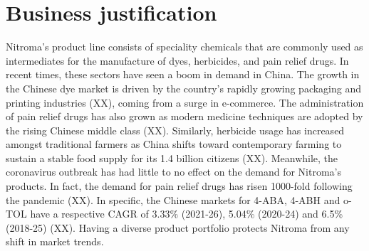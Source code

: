 \section*{Business justification}


Nitroma’s product line consists of speciality chemicals that are commonly used as intermediates for the manufacture of dyes, herbicides, and pain relief drugs. In recent times, these sectors have seen a boom in demand in China. The growth in the Chinese dye market is driven by the country’s rapidly growing packaging and printing industries (XX), coming from a surge in e-commerce. The administration of pain relief drugs has also grown as modern medicine techniques are adopted by the rising Chinese middle class (XX). Similarly, herbicide usage has increased amongst traditional farmers as China shifts toward contemporary farming to sustain a stable food supply for its 1.4 billion citizens (XX). Meanwhile, the coronavirus outbreak has had little to no effect on the demand for Nitroma’s products. In fact, the demand for pain relief drugs has risen 1000-fold following the pandemic (XX). In specific, the Chinese markets for 4-ABA, 4-ABH and o-TOL have a respective CAGR of 3.33\% (2021-26), 5.04\% (2020-24) and 6.5\% (2018-25) (XX). Having a diverse product portfolio protects Nitroma from any shift in market trends.

